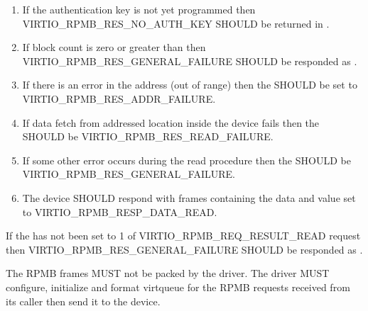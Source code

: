 \begin{enumerate}
\item If the authentication key is not yet programmed then
  VIRTIO_RPMB_RES_NO_AUTH_KEY SHOULD be returned in .

\item If block count is zero or greater than  then
  VIRTIO_RPMB_RES_GENERAL_FAILURE SHOULD be responded as .

\item If there is an error in the address (out of range) then the
   SHOULD be set to VIRTIO_RPMB_RES_ADDR_FAILURE.

\item If data fetch from addressed location inside the device fails
  then the  SHOULD be VIRTIO_RPMB_RES_READ_FAILURE.

\item If some other error occurs during the read procedure then the
   SHOULD be VIRTIO_RPMB_RES_GENERAL_FAILURE.

\item The device SHOULD respond with  frames containing the data and  value set to VIRTIO_RPMB_RESP_DATA_READ.
\end{enumerate}


If the  has not been set to 1 of VIRTIO_RPMB_REQ_RESULT_READ
request then VIRTIO_RPMB_RES_GENERAL_FAILURE SHOULD be responded as .


The RPMB frames MUST not be packed by the driver.
The driver MUST configure, initialize and format virtqueue for the RPMB requests received from its caller then send it to the device.



